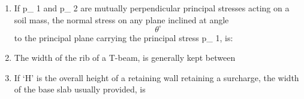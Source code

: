 \documentclass[11pt,a4paper]{article}
\begin{document}
\begin{enumerate}
{}
\\
\item{If p\_ 1 and p\_ 2 are mutually perpendicular principal stresses acting on a soil mass, the normal stress on any plane inclined at angle $${\theta ^ \circ }$$ to the principal plane carrying the principal stress p\_ 1, is:
}
\\
\item{The width of the rib of a T-beam, is generally kept between}
\\
\item{If `H' is the overall height of a retaining wall retaining a surcharge, the width of the base slab usually provided, is
}
\\
\end{enumerate}
\end{document}
